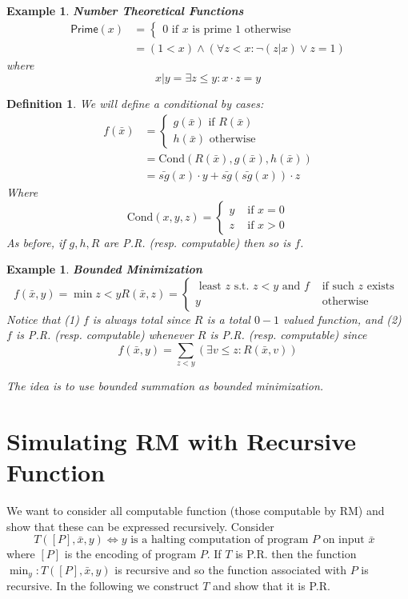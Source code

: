 \documentclass[twoside]{article}
\newtheorem{definition}[theorem]{Definition}
\newtheorem{example}[theorem]{Example}
\begin{document}
\begin{example}
\textbf{Number Theoretical Functions}
\begin{align*}
\mathsf{Prime}(x) &= 	\begin{cases}
							0 \mbox{ if $x$ is prime }
							1 \mbox{ otherwise }						
						\end{cases}\\
&= (1 < x) \land (\forall z < x: \lnot (z | x) \lor z = 1)
\end{align*}
where 
\[x | y = \exists z \leq y: x \cdot z = y \]
\end{example}

\begin{definition}
We will define a conditional by cases:
\begin{align*}
f(\bar{x}) &= 	\begin{cases}
					g(\bar{x}) \mbox{ if } R(\bar{x}) \\
					h(\bar{x}) \mbox{ otherwise }
				\end{cases}\\
&= \mbox{Cond}(R(\bar{x}), g(\bar{x}), h(\bar{x}))\\
&= \bar{sg}(x)\cdot y + \bar{sg}(\bar{sg}(x)) \cdot z
\end{align*}
Where 
\[\mbox{Cond}(x,y,z) = \begin{cases}
y &\mbox{ if } x = 0 \\
z &\mbox{ if } x > 0
\end{cases}\]
As before, if $g, h, R$ are P.R. (resp. computable) then so is $f$.			
\end{definition}

\begin{example}
\textbf{Bounded Minimization}
\[f(\bar{x}, y) = \min z < y R(\bar{x}, z) = \begin{cases}
\mbox{ least $z$ s.t. $z < y$ and $f$} &\mbox{ if such $z$ exists }\\
y &\mbox{ otherwise }
\end{cases}\]
Notice that (1) $f$ is always total since $R$ is a total $0-1$ valued function, and (2) $f$ is P.R. (resp. computable) whenever $R$ is P.R. (resp. computable) since 
\[f(\bar{x}, y) = \sum_{z<y} \left(\exists v \leq z: R(\bar{x}, v) \right)\]

The idea is to use bounded summation as bounded minimization.
\end{example}

\section{Simulating RM with Recursive Function}
We want to consider all computable function (those computable by RM) and show that these can be expressed recursively. Consider 
\[T([P], \bar{x}, y) \iff y \mbox{ is a halting computation of program $P$ on input $\bar{x}$ }\]
where $[P]$ is the encoding of program $P$. If $T$ is P.R. then the function $\min_y: T([P],\bar{x},y)$ is recursive and so the function associated with $P$ is recursive. In the following we construct $T$ and show that it is P.R.
\end{document}
